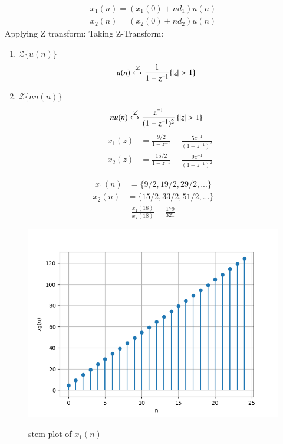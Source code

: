 \documentclass[journal,12pt,onecolumn]{IEEEtran}
\theoremstyle{remark}
\providecommand{\abs}[1]{\left\vert#1\right\vert}
\begin{document}
\begin{align}
x_1(n)=(x_1(0)+nd_1)u(n)
\label{eq:1}
\end{align}
\begin{align}
x_2(n)=(x_2(0)+nd_2)u(n)
\label{eq:2}
\end{align}
Applying Z transform:
Taking Z-Transform:
\begin{enumerate}
    \item $\mathcal{Z}\{u(n)\}$
\begin{align}
    u(n) &\xleftrightarrow{\mathcal{Z}} \frac{1}{1-z^{-1}} \{\abs{z} > 1\} \label{eq 10.5.2.11_7}
\end{align}
    \item $\mathcal{Z}\{nu(n)\}$ 
\begin{align}
    nu(n) &\xleftrightarrow{\mathcal{Z}}  \frac{z^{-1}}{(1-z^{-1})^2}\, \{\abs{z} > 1\} \label{eq 10.5.2.11_8} 
\end{align}
\begin{align}
    x_1(z) &=\frac{9/2}{1-z^{-1}} + \frac{ 5z^{-1}}{(1-z^{-1})^2}\\
     x_2(z)&= \frac{15/2}{1-z^{-1}} + \frac{9z^{-1}}{(1-z^{-1})^2}
\end{align}
\end{enumerate}
\begin{align}
x_1(n)&= \lbrace 9/2,19/2,29/2,...\rbrace 
\end{align}
\begin{align}
x_2(n)&= \lbrace 15/2,33/2,51/2,...\rbrace 
\end{align}
\begin{align}
\frac{x_1(18)}{x_2(18)}=\frac{179}{321}
\end{align}
\begin{figure}[h!]
	\centering
	\includegraphics[width=\columnwidth]{figs/fig1.png}
	\label{fig:plot}
	\caption{\large{stem plot of $x_1(n)$}}
\end{figure}
\end{document}
